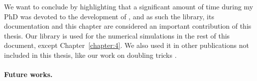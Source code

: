 We want to conclude by highlighting that a significant amount of time during my PhD was devoted to the development of \SMPyBandits, and as such the library, its documentation and this chapter  are considered an important contribution of this thesis.
%
Our library is used for the numerical simulations in the rest of this document, except Chapter~\ref{chapter:4}.
We also used it in other publications not included in this thesis, like our work on doubling tricks \cite{Besson2018DoublingTricks}.


\paragraph{Future works.}
%



